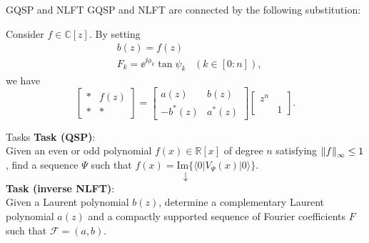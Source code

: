 \begin{frame}{GQSP and NLFT}
    GQSP and NLFT are connected by the following substitution:
    \begin{theorem}
        Consider $f\in \mathbb{C}[z]$. By setting
        \begin{align}
            &b(z) = f(z) \\
            &F_k = \ee^{\ii\phi_k}\tan\psi_k\;\;\;(k\in[0:n]),
        \end{align}
        we have
        \begin{equation}
            \left[\begin{matrix}
                * & f(z) \\ * & *
            \end{matrix}\right] = \left[\begin{matrix}
                a(z) & b(z) \\ -b^*(z) & a^*(z)
            \end{matrix}\right] \left[\begin{matrix}
                z^n \\ & 1
            \end{matrix}\right].
        \end{equation}
    \end{theorem}
\end{frame}

\begin{frame}{Tasks}
    \textbf{Task (QSP)}:\\
    Given an even or odd polynomial $f(x)\in\mathbb{R}[x]$ of degree $n$ satisfying $\left\lVert{f}\right\rVert_\infty\le1$, find a sequence $\Psi$ such that $f(x) = \mathrm{Im}\{\langle0|V_\Psi(x)|0\rangle\}$. 
    $$\downarrow$$
    \textbf{Task (inverse NLFT)}:\\
    Given a Laurent polynomial $b(z)$, determine a complementary Laurent polynomial $a(z)$ and a compactly supported sequence of Fourier coefficients $F$ such that $\mathcal{F} = (a,b)$.
\end{frame}

